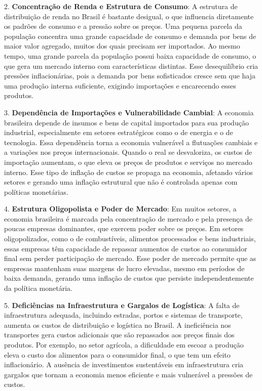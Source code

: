 \documentclass[a4paper,12pt]{article}[abntex2]
\begin{document}
2. \textbf{Concentração de Renda e Estrutura de Consumo}: A estrutura de distribuição de renda no Brasil é bastante desigual, o que influencia diretamente os padrões de consumo e a pressão sobre os preços. Uma pequena parcela da população concentra uma grande capacidade de consumo e demanda por bens de maior valor agregado, muitos dos quais precisam ser importados. Ao mesmo tempo, uma grande parcela da população possui baixa capacidade de consumo, o que gera um mercado interno com características distintas. Esse desequilíbrio cria pressões inflacionárias, pois a demanda por bens sofisticados cresce sem que haja uma produção interna suficiente, exigindo importações e encarecendo esses produtos.

3. \textbf{Dependência de Importações e Vulnerabilidade Cambial}: A economia brasileira depende de insumos e bens de capital importados para sua produção industrial, especialmente em setores estratégicos como o de energia e o de tecnologia. Essa dependência torna a economia vulnerável a flutuações cambiais e a variações nos preços internacionais. Quando o real se desvaloriza, os custos de importação aumentam, o que eleva os preços de produtos e serviços no mercado interno. Esse tipo de inflação de custos se propaga na economia, afetando vários setores e gerando uma inflação estrutural que não é controlada apenas com políticas monetárias.

4. \textbf{Estrutura Oligopolista e Poder de Mercado}: Em muitos setores, a economia brasileira é marcada pela concentração de mercado e pela presença de poucas empresas dominantes, que exercem poder sobre os preços. Em setores oligopolizados, como o de combustíveis, alimentos processados e bens industriais, essas empresas têm capacidade de repassar aumentos de custos ao consumidor final sem perder participação de mercado. Esse poder de mercado permite que as empresas mantenham suas margens de lucro elevadas, mesmo em períodos de baixa demanda, gerando uma inflação de custos que persiste independentemente da política monetária.

5. \textbf{Deficiências na Infraestrutura e Gargalos de Logística}: A falta de infraestrutura adequada, incluindo estradas, portos e sistemas de transporte, aumenta os custos de distribuição e logística no Brasil. A ineficiência nos transportes gera custos adicionais que são repassados aos preços finais dos produtos. Por exemplo, no setor agrícola, a dificuldade em escoar a produção eleva o custo dos alimentos para o consumidor final, o que tem um efeito inflacionário. A ausência de investimentos sustentáveis em infraestrutura cria gargalos que tornam a economia menos eficiente e mais vulnerável a pressões de custos.
\end{document}
